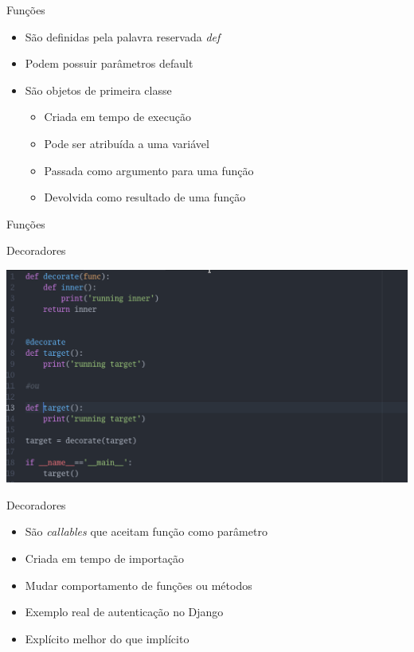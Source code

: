 \begin{frame}{Funções}

\begin{itemize}
	\item São definidas pela palavra reservada \textit{def}
	\item Podem possuir parâmetros default
	\item São objetos de primeira classe
	\begin{itemize}
		\item Criada em tempo de execução
		\item Pode ser atribuída a uma variável
		\item Passada como argumento para uma função		
		\item Devolvida como resultado de uma função
	\end{itemize}
\end{itemize}
\end{frame}


\begin{frame}{Funções}

\centering {}
\lstset{language=Python}

\end{frame}


\begin{frame}{Decoradores }
\begin{center}
	\centering {}
	\includegraphics[scale=0.4]{img/decorator_example.png}
\end{center}
\end{frame}

\begin{frame}{Decoradores}

\begin{itemize}
	\item São \textit{callables} que aceitam função como parâmetro 
	\item Criada em tempo de importação
	\item Mudar comportamento de funções ou métodos		
	\item Exemplo real de autenticação no Django
	\item Explícito melhor do que implícito
\end{itemize}

\end{frame}

